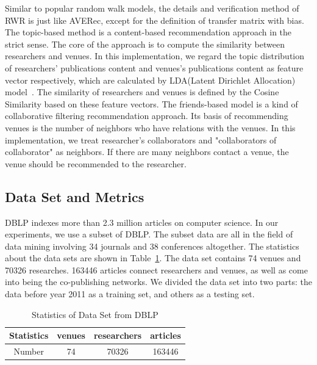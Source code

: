 \documentclass[9pt]{acm_proc_article-sp}
\begin{document}
Similar to popular random walk models, the details and verification method of RWR is just like AVERec, except for the definition of transfer matrix with bias. The topic-based method is a content-based recommendation approach in the strict sense. The core of the approach is to compute the similarity between researchers and venues. In this implementation, we regard the topic distribution of researchers' publications content and venues's publications content as feature vector respectively, which are calculated by LDA(Latent Dirichlet Allocation) model~\cite{blei2003latent}. The similarity of researchers and venues is defined by the Cosine Similarity based on these feature vectors. The friends-based model is a kind of collaborative filtering recommendation approach. Its basis of recommending venues is the number of neighbors who have relations with the venues. In this implementation, we treat researcher's collaborators and "collaborators of collaborator" as neighbors. If there are many neighbors contact a venue, the venue should be recommended to the researcher.

\subsection{Data Set and Metrics}
DBLP indexes more than 2.3 million articles on computer science. In our experiments, we use a subset of DBLP. The subset data are all in the field of data mining involving 34 journals and 38 conferences altogether. The statistics about the data sets are shown in Table~\ref{table1}. The data set contains 74 venues and 70326 researches. 163446 articles connect researchers and venues, as well as come into being the co-publishing networks. We divided the data set into two parts: the data before year 2011 as a training set, and others as a testing set.
\begin{table}
\renewcommand{\arraystretch}{1.2}
\centering
\caption{Statistics of Data Set from DBLP}
\label{table1}
\begin{tabular}{|c|c|c|c|} \hline
Statistics &venues&researchers&articles\\ \hline
Number & 74 & 70326 &163446 \\
\hline\end{tabular}
\end{table}
\end{document}
